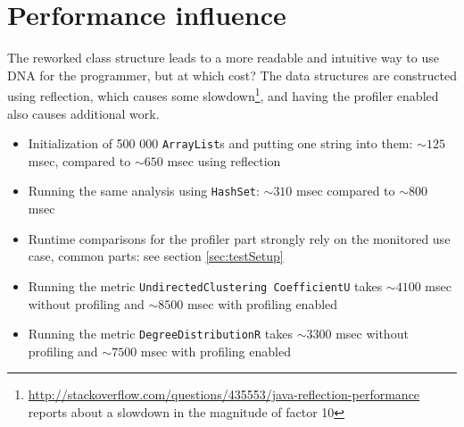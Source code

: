 \section{Performance influence}
	The reworked class structure leads to a more readable and intuitive way to use DNA for
	the programmer, but at which cost? The data structures are constructed using reflection,
	which causes some
	slowdown\footnote{\url{http://stackoverflow.com/questions/435553/java-reflection-performance}
	reports about a slowdown in the magnitude of factor 10}, and having the profiler
	enabled also causes additional work.
	
	\begin{itemize}
		\item Initialization of 500 000 \texttt{ArrayList}s and putting one string into them:
			$\sim 125$ msec, compared to $\sim 650$ msec using reflection
		\item Running the same analysis using \texttt{HashSet}: $\sim 310$ msec compared to
			$\sim 800$ msec
		\item Runtime comparisons for the profiler part strongly rely on the monitored use case,
			common parts: see section \ref{sec:testSetup}
		\item Running the metric \texttt{Undirected\allowbreak Clustering\allowbreak
			CoefficientU} takes $\sim 4100$ msec without profiling and $\sim 8500$ msec with
			profiling enabled 
		\item Running the metric \texttt{Degree\allowbreak DistributionR} takes $\sim 3300$
			msec without profiling and $\sim 7500$ msec with profiling enabled  
	\end{itemize}
	
